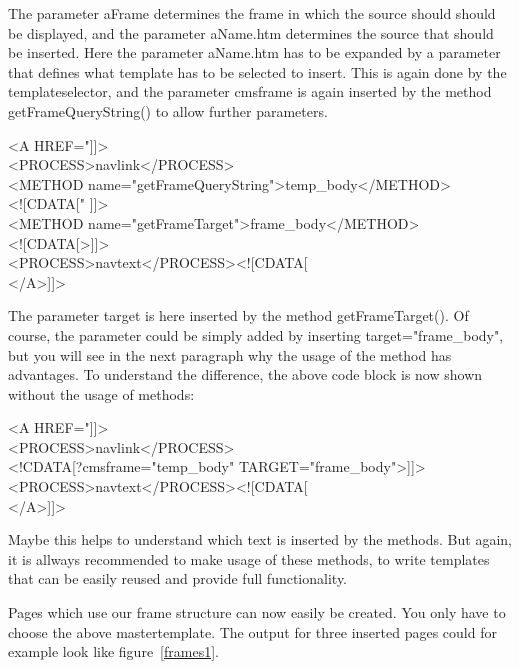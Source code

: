 The parameter {\name aFrame} determines the frame in which the source should should be displayed,
and the parameter {\name aName.htm} determines the source that should be inserted.
Here the parameter {\name aName.htm} has to be expanded by a parameter that defines what template has
to be selected to insert. This is again done by the templateselector, and the parameter
{\name cmsframe} is again inserted by the method {\meth getFrameQueryString()} to allow further
parameters.

\begin{xml}
<A HREF="]]>\\
  <PROCESS>navlink</PROCESS>\\
    <METHOD name="getFrameQueryString">temp\_body</METHOD>\\
    <![CDATA[" ]]>\\
    <METHOD name="getFrameTarget">frame\_body</METHOD>\\
    <![CDATA[>]]>\\
  <PROCESS>navtext</PROCESS><![CDATA[\\
</A>]]>\\
\end{xml}


The parameter {\name target} is here inserted by the method {\meth getFrameTarget()}. 
Of course, the parameter could be simply added by inserting
{\tag target="frame\_body"}, but you will see in the next paragraph why the usage of the method
has advantages.
To understand the difference, the above code block is now shown without the usage of
methods:
\begin{xml}
<A HREF="]]>\\
  <PROCESS>navlink</PROCESS>\\
    <!CDATA[?cmsframe="temp\_body" TARGET="frame\_body">]]>\\
  <PROCESS>navtext</PROCESS><![CDATA[\\
</A>]]>\\
\end{xml}


Maybe this helps to understand which text is inserted by the methods. But again, it is allways
recommended to make usage of these methods, to write templates that can be easily reused and
provide full functionality.

Pages which use our frame structure can now easily be created. 
You only have to choose the above mastertemplate. 
The output for three inserted pages could for example look like
figure~\ref{frames1}.

